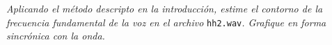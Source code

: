 


\emph{Aplicando el método descripto en la introducción, estime el contorno de la frecuencia fundamental
de la voz en el archivo} \texttt{hh2.wav}\emph{. Grafique en forma sincrónica con la onda.}

